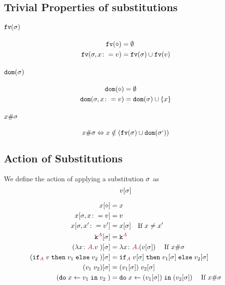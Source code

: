 \documentclass{report}
\begin{document}
\subsection{Trivial Properties of substitutions}
\paragraph{$\texttt{fv}(\sigma)$}
\begin{align*}
    \texttt{fv}(\diamond) &= \emptyset\\
    \texttt{fv}(\sigma, x\colon= v) &= \texttt{fv}(\sigma)\cup\texttt{fv}(v)
\end{align*}
\paragraph{$\texttt{dom}(\sigma)$}
\begin{align*}
    \texttt{dom}(\diamond) & = \emptyset\\
    \texttt{dom}(\sigma, x\colon= v) & = \texttt{dom}(\sigma)\cup\left\{x\right\}
\end{align*}

\paragraph{$x \# \sigma$}
\begin{equation}
    x \# \sigma \Leftrightarrow x\notin(\texttt{fv}(\sigma)\cup\texttt{dom}(\sigma`))
\end{equation}

\subsection{Action of Substitutions}
    We define the action of applying a substitution $\sigma$ as 
    $$v[\sigma]$$

    
    \begin{align*}
        x[\diamond] & = x \\
        x[\sigma,x\colon= v] & = v \\
        x[\sigma,x'\colon= v'] & = x[\sigma]\quad\text{If }x \neq x'\\
        \texttt{k}^{\color{purple} A}[\sigma] & = \texttt{k}^{\color{purple} A} \\
        (\lambda x \colon {\color{purple}A}. v\;)[\sigma] &= \lambda x \colon {\color{purple}A}. (v[\sigma])\;\quad\text{If }x\#\sigma\\
        (\texttt{if}_{\textcolor{purple}{A}}\; v\; \texttt{then}\; v_1 \;\texttt{else} \; v_2\;)[\sigma] &= \texttt{if}_{\textcolor{purple}{A}}\; v[\sigma]\; \texttt{then}\; v_1[\sigma] \;\texttt{else} \; v_2[\sigma]\;\\
        (v_1\; v_2)[\sigma]&= (v_1[\sigma])\; v_2[\sigma]\\
        (\texttt{do}\; x \leftarrow v_1 \;\texttt{in}\; v_2\;)&= \texttt{do}\; x \leftarrow (v_1[\sigma]) \;\texttt{in}\; (v_2[\sigma])\;\quad\text{If } x\#\sigma\\
    \end{align*}
\end{document}
